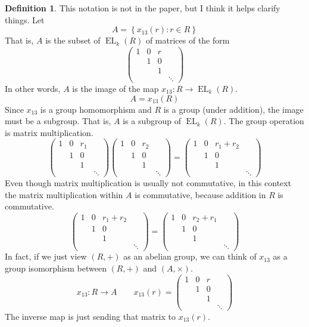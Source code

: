 \documentclass[12pt]{article}
\theoremstyle{definition}
\newtheorem{definition}[theorem]{Definition}
\newcommand{\lb}{\left\{}
\newcommand{\rb}{\right\}}
\DeclareMathOperator{\EL}{EL}
\begin{document}
\begin{definition}
This notation is not in the paper, but I think it helps clarify things. Let
\[
	A = \lb x_{13}(r) : r \in R \rb
\]
That is, $A$ is the subset of $\EL_k(R)$ of matrices of the form
\[
	\begin{pmatrix}
		1 & 0 & r \\
		& 1 & 0 \\
		& & 1 \\
		&&& \ddots
	\end{pmatrix}
\]
In other words, $A$ is the image of the map $x_{13}:R \to \EL_k(R)$.
\[
	A = x_{13}(R)
\]
Since $x_{13}$ is a group homomorphism and $R$ is a group (under addition), the image must be a subgroup. That is, $A$ is a subgroup of $\EL_k(R)$. The group operation is matrix multiplication.
\[
	\begin{pmatrix}
		1 & 0 & r_1 \\
		& 1 & 0 \\
		& & 1 \\
		&&& \ddots
	\end{pmatrix}
	\begin{pmatrix}
		1 & 0 & r_2 \\
		& 1 & 0 \\
		& & 1 \\
		&&& \ddots
	\end{pmatrix}
	=
	\begin{pmatrix}
		1 & 0 & r_1 + r_2 \\
		& 1 & 0 \\
		& & 1 \\
		&&& \ddots
	\end{pmatrix}
\]
Even though matrix multiplication is usually not commutative, in this context the matrix multiplication within $A$ is commutative, because addition in $R$ is commutative.
\[
	\begin{pmatrix}
		1 & 0 & r_1 + r_2 \\
		& 1 & 0 \\
		& & 1 \\
		&&& \ddots
	\end{pmatrix}
	=
	\begin{pmatrix}
		1 & 0 & r_2 + r_1 \\
		& 1 & 0 \\
		& & 1 \\
		&&& \ddots
	\end{pmatrix}
\]
In fact, if we just view $(R,+)$ as an abelian group, we can think of $x_{13}$ as a group isomorphism between $(R,+)$ and $(A, \times)$.
\[
	x_{13}:R \to A \qquad x_{13}(r) = 
	\begin{pmatrix}
		1 & 0 & r \\
		& 1 & 0 \\
		& & 1 \\
		&&& \ddots
	\end{pmatrix}
\]
The inverse map is just sending that matrix to $x_{13}(r)$. 
\end{definition}
\end{document}
